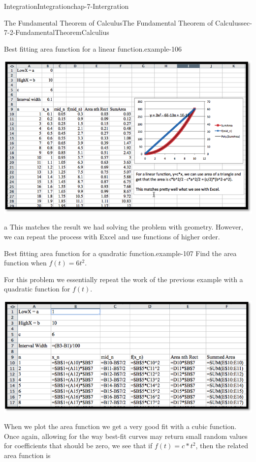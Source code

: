 \documentclass[oneside,10pt,]{book}
\numberwithin{equation}{section}
\begin{document}
\begin{chapterptx}{Integration}{}{Integration}{}{}{chap-7-Intergration}
\begin{sectionptx}{The Fundamental Theorem of Calculus}{}{The Fundamental Theorem of Calculus}{}{}{sec-7-2-FundamentalTheoremCalculius}
\begin{example}{Best fitting area function for a linear function.}{example-106}
\begin{sidebyside}{1}{0.1}{0.1}{0}
\begin{sbspanel}{0.8}
\includegraphics[width=1\linewidth]{images/sec7-2-5.png}
\end{sbspanel}%
\end{sidebyside}%
\end{example}
 a \hypertarget{p-2633}{}%
This matches the result we had solving the problem with geometry.  However, we can repeat the process with Excel and use functions of higher order.%
\begin{example}{Best fitting area function for a quadratic function.}{example-107}%
\hypertarget{p-2634}{}%
Find the area function when \(f(t) = 6t^2\).%
\par
\hypertarget{p-2635}{}%
For this problem we essentially repeat the work of the previous example with a quadratic function for \(f(t)\).%
\begin{sidebyside}{1}{0.05}{0.05}{0}%
\begin{sbspanel}{0.9}%
\includegraphics[width=1\linewidth]{images/sec7-2-6.png}
\end{sbspanel}%
\end{sidebyside}%
\par
\hypertarget{p-2636}{}%
When we plot the area function we get a very good fit with a cubic function.  Once again, allowing for the way best-fit curves may return small random values for coefficients that should be zero, we see that if \(f(t) =c*t^2\), then the related area function is%

\end{example}
\end{sectionptx}
\end{chapterptx}
\end{document}
